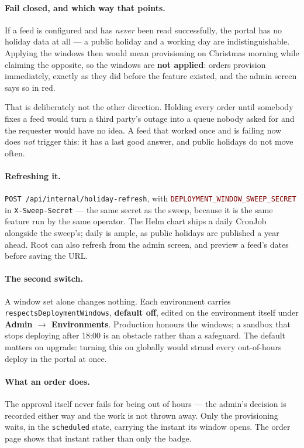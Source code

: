 \documentclass[12pt,a4paper,twoside]{report}
\newcommand{\code}[1]{\texttt{#1}}
\newcommand{\env}[1]{\texttt{\textcolor{Maroon}{#1}}}
\newcommand{\menu}[1]{\textsf{\textbf{#1}}}
\begin{document}
\paragraph{Fail closed, and which way that points.} If a feed is configured and
has \emph{never} been read successfully, the portal has no holiday data at all
--- a public holiday and a working day are indistinguishable. Applying the
windows then would mean provisioning on Christmas morning while claiming the
opposite, so the windows are \textbf{not applied}: orders provision immediately,
exactly as they did before the feature existed, and the admin screen says so in
red.

That is deliberately not the other direction. Holding every order until somebody
fixes a feed would turn a third party's outage into a queue nobody asked for and
the requester would have no idea. A feed that worked once and is failing now
does \emph{not} trigger this: it has a last good answer, and public holidays do
not move often.

\paragraph{Refreshing it.} \code{POST /api/internal/holiday-refresh}, with
\env{DEPLOYMENT\_WINDOW\_SWEEP\_SECRET} in \code{X-Sweep-Secret} --- the same
secret as the sweep, because it is the same feature run by the same operator.
The Helm chart ships a daily CronJob alongside the sweep's; daily is ample, as
public holidays are published a year ahead. Root can also refresh from the admin
screen, and preview a feed's dates before saving the URL.

\paragraph{The second switch.} A window set alone changes nothing. Each
environment carries \code{respectsDeploymentWindows}, \textbf{default off},
edited on the environment itself under \menu{Admin $\rightarrow$ Environments}.
Production honours the windows; a sandbox that stops deploying after 18:00 is an
obstacle rather than a safeguard. The default matters on upgrade: turning this on
globally would strand every out-of-hours deploy in the portal at once.

\paragraph{What an order does.} The approval itself never fails for being out of
hours --- the admin's decision is recorded either way and the work is not thrown
away. Only the provisioning waits, in the \code{scheduled} state, carrying the
instant its window opens. The order page shows that instant rather than only the
badge.
\end{document}
